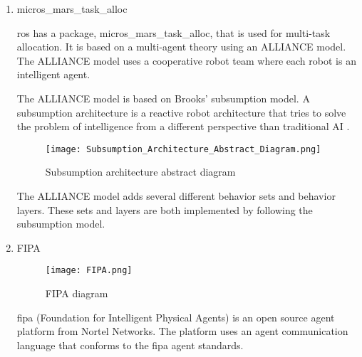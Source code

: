 
\begin{enumerate}
    \item micros\_mars\_task\_alloc

    \acs{ros} has a package, micros\_mars\_task\_alloc, that is used for multi-task allocation. It is based on
    a multi-agent theory using an ALLIANCE model. The ALLIANCE model uses a cooperative robot team where
    each robot is an intelligent agent.
    
    The ALLIANCE model is based on Brooks' subsumption model. A subsumption architecture is a reactive robot architecture that tries to solve 
    the problem of intelligence from a different perspective than traditional AI \cite{ros:micros_mars_task_alloc}. 
    
    \begin{figure}[ht]
        \centering
        \texttt{[image: Subsumption\_Architecture\_Abstract\_Diagram.png]}
        \caption[Subsumption architecture abstract diagram]{Subsumption architecture abstract diagram}
    \end{figure}
    
    The ALLIANCE model adds several different behavior sets and behavior layers. These sets and layers are both implemented by following 
    the subsumption model.

    \newpage
    \item FIPA 

    \begin{figure}[ht]
        \centering
        \texttt{[image: FIPA.png]}
        \caption[FIPA]{FIPA diagram}
    \end{figure}

    \acs{fipa} (Foundation for Intelligent Physical Agents) is an open source agent platform from Nortel Networks. The platform uses an 
    agent communication language that conforms to the \acs{fipa} agent standards. \cite{FIPA-OS}

\end{enumerate}